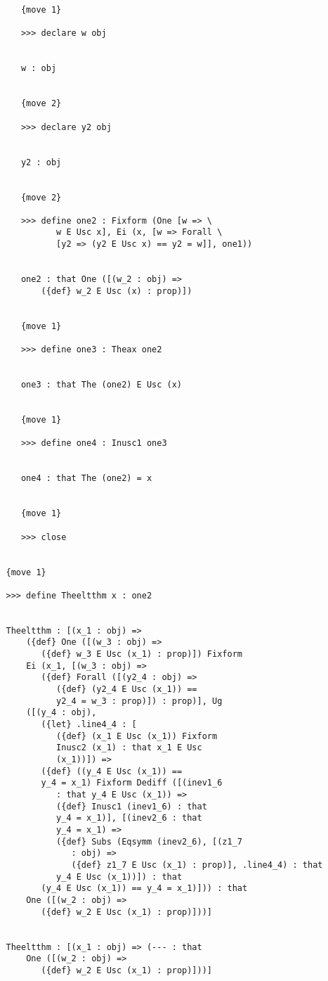 \documentclass[12pt]{article}
\begin{document}
\begin{verbatim}
      {move 1}

      >>> declare w obj


      w : obj


      {move 2}

      >>> declare y2 obj


      y2 : obj


      {move 2}

      >>> define one2 : Fixform (One [w => \
             w E Usc x], Ei (x, [w => Forall \
             [y2 => (y2 E Usc x) == y2 = w]], one1))


      one2 : that One ([(w_2 : obj) => 
          ({def} w_2 E Usc (x) : prop)])


      {move 1}

      >>> define one3 : Theax one2


      one3 : that The (one2) E Usc (x)


      {move 1}

      >>> define one4 : Inusc1 one3


      one4 : that The (one2) = x


      {move 1}

      >>> close


   {move 1}

   >>> define Theeltthm x : one2


   Theeltthm : [(x_1 : obj) => 
       ({def} One ([(w_3 : obj) => 
          ({def} w_3 E Usc (x_1) : prop)]) Fixform 
       Ei (x_1, [(w_3 : obj) => 
          ({def} Forall ([(y2_4 : obj) => 
             ({def} (y2_4 E Usc (x_1)) == 
             y2_4 = w_3 : prop)]) : prop)], Ug 
       ([(y_4 : obj), 
          ({let} .line4_4 : [
             ({def} (x_1 E Usc (x_1)) Fixform 
             Inusc2 (x_1) : that x_1 E Usc 
             (x_1))]) => 
          ({def} ((y_4 E Usc (x_1)) == 
          y_4 = x_1) Fixform Dediff ([(inev1_6 
             : that y_4 E Usc (x_1)) => 
             ({def} Inusc1 (inev1_6) : that 
             y_4 = x_1)], [(inev2_6 : that 
             y_4 = x_1) => 
             ({def} Subs (Eqsymm (inev2_6), [(z1_7 
                : obj) => 
                ({def} z1_7 E Usc (x_1) : prop)], .line4_4) : that 
             y_4 E Usc (x_1))]) : that 
          (y_4 E Usc (x_1)) == y_4 = x_1)])) : that 
       One ([(w_2 : obj) => 
          ({def} w_2 E Usc (x_1) : prop)]))]


   Theeltthm : [(x_1 : obj) => (--- : that 
       One ([(w_2 : obj) => 
          ({def} w_2 E Usc (x_1) : prop)]))]



\end{verbatim}
\end{document}
